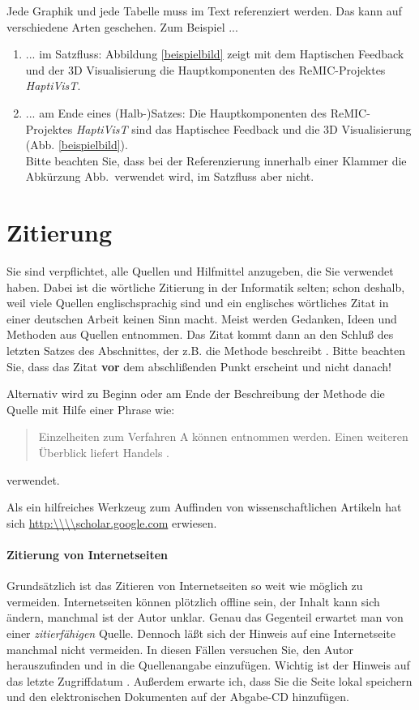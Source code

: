 Jede Graphik und jede Tabelle muss im Text referenziert werden.
Das kann auf verschiedene Arten geschehen. Zum Beispiel ...
\begin{enumerate}
\item ... im Satzfluss: Abbildung \ref{beispielbild} zeigt mit dem Haptischen Feedback und der 3D Visualisierung die Hauptkomponenten des ReMIC-Projektes \emph{HaptiVisT}.
\item ... am Ende eines (Halb-)Satzes:  Die Hauptkomponenten des ReMIC-Projektes \emph{HaptiVisT} sind das Haptischee Feedback und die 3D Visualisierung (Abb. \ref{beispielbild}).\\
Bitte beachten Sie, dass bei der Referenzierung innerhalb einer Klammer die Abkürzung Abb.~verwendet wird, im Satzfluss aber nicht.
\end{enumerate}


\section{Zitierung}\label{zitierung}

Sie sind verpflichtet, alle Quellen und Hilfmittel anzugeben, die Sie verwendet haben.
Dabei ist die wörtliche Zitierung in der Informatik selten; schon deshalb, weil viele Quellen englischsprachig sind und ein englisches wörtliches Zitat in einer deutschen Arbeit keinen Sinn macht.
Meist werden Gedanken, Ideen und Methoden aus Quellen entnommen.
Das Zitat kommt dann an den Schluß des letzten Satzes des Abschnittes, der z.B. die Methode beschreibt \cite{szalo2015graphmic}.
Bitte beachten Sie, dass das Zitat \textbf{vor} dem abschlißenden Punkt erscheint und nicht danach!

Alternativ wird zu Beginn oder am Ende der Beschreibung der Methode die Quelle mit Hilfe einer Phrase wie:
\begin{quote}
Einzelheiten zum Verfahren A können \cite{palm2004color} entnommen werden.
Einen weiteren Überblick liefert Handels \cite{handels2000medizinische}.
\end{quote}
verwendet.

Als ein hilfreiches Werkzeug zum Auffinden von wissenschaftlichen Artikeln hat sich \url{http:\\\\scholar.google.com} erwiesen.

\paragraph{Zitierung von Internetseiten}
Grundsätzlich ist das Zitieren von Internetseiten so weit wie möglich zu vermeiden.
Internetseiten können plötzlich offline sein, der Inhalt kann sich ändern, manchmal ist der Autor unklar.
Genau das Gegenteil erwartet man von einer \emph{zitierfähigen} Quelle.
Dennoch läßt sich der Hinweis auf eine Internetseite manchmal nicht vermeiden.
In diesen Fällen versuchen Sie, den Autor herauszufinden und in die Quellenangabe einzufügen.
Wichtig ist der Hinweis auf das letzte Zugriffdatum \cite{zitieren13}.
Außerdem erwarte ich, dass Sie die Seite lokal speichern und den elektronischen Dokumenten auf der Abgabe-CD hinzufügen.

